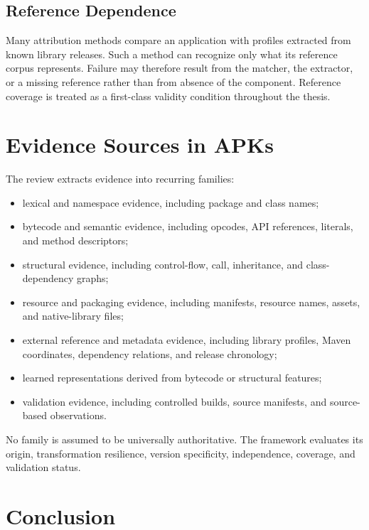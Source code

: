 \subsection{Reference Dependence}

Many attribution methods compare an application with profiles extracted from
known library releases. Such a method can recognize only what its reference
corpus represents. Failure may therefore result from the matcher, the
extractor, or a missing reference rather than from absence of the component.
Reference coverage is treated as a first-class validity condition throughout
the thesis.

\section{Evidence Sources in APKs}

The review extracts evidence into recurring families:

\begin{itemize}
  \item lexical and namespace evidence, including package and class names;
  \item bytecode and semantic evidence, including opcodes, API references,
    literals, and method descriptors;
  \item structural evidence, including control-flow, call, inheritance, and
    class-dependency graphs;
  \item resource and packaging evidence, including manifests, resource names,
    assets, and native-library files;
  \item external reference and metadata evidence, including library profiles,
    Maven coordinates, dependency relations, and release chronology;
  \item learned representations derived from bytecode or structural features;
  \item validation evidence, including controlled builds, source manifests,
    and source-based observations.
\end{itemize}

No family is assumed to be universally authoritative. The framework evaluates
its origin, transformation resilience, version specificity, independence,
coverage, and validation status.

\section{Conclusion}

